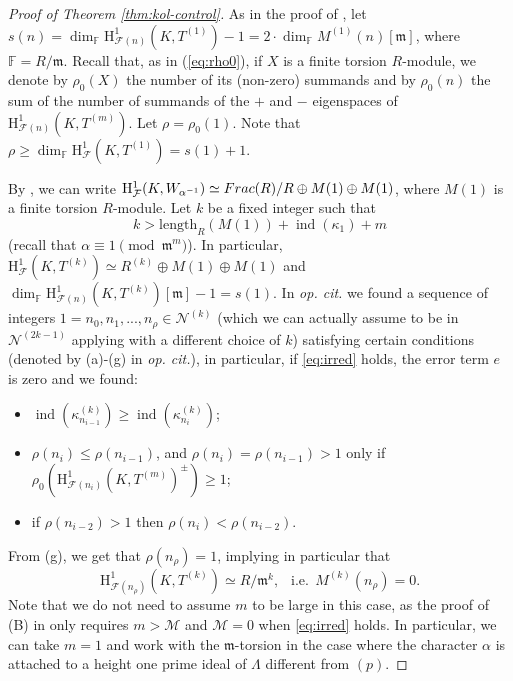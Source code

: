 \documentclass[10pt,reqno]{amsart}
\numberwithin{equation}{section}
\theoremstyle{plain}
\theoremstyle{definition}
\theoremstyle{definition}
\theoremstyle{plain}
\theoremstyle{plain}
\theoremstyle{plain}
\theoremstyle{plain}
\theoremstyle{plain}
\theoremstyle{plain}
\DeclareMathOperator{\ord}{ord}
\newcommand{\ind}{\operatorname{ind}}
\newcommand{\F}{\mathcal{F}}
\newcommand{\CF}{\mathcal{F}}
\newcommand{\Fcal}{\mathcal{F}}
\newcommand{\cN}{\mathcal{N}}
\newcommand{\kap}{\kappa}
\newcommand{\fm}{\mathfrak{m}}
\newcommand{\rH}{\mathrm{H}}
\begin{document}
\begin{proof}[Proof of Theorem \ref{thm:kol-control}]
As in the proof of \cite[Thm. 6.1.1]{eisenstein_cyc}, let $s(n)= \dim_{\mathbb{F}}\rH^1_{\F(n)}(K,T^{(1)})-1 = 2\cdot\dim_\mathbb{F}M^{(1)}(n)[\fm]$, where $\mathbb{F}=R/\fm$. Recall that, as in (\ref{eq:rho0}),
if $X$ is a finite torsion $R$-module, we denote by $\rho_0(X)$ the number of its (non-zero) summands and by $\rho_0(n)$ the sum of the number of summands of the $+$ and $-$ eigenspaces of $\rH^1_{\F(n)}(K, T^{(m)})$.
Let $\rho = \rho_0(1)$. Note that $\rho \geq \dim_{\mathbb{F}}\rH^1_{\F}(K,T^{(1)}) = s(1)+1$. 

By \cite[Thm 3.3.8]{eisenstein}, we can write $\rH^1_{\Fcal}(K,W_{\alpha^{-1}})\simeq {\rm Frac}(R)/R \oplus M(1)\oplus M(1)$, where $M(1)$ is a finite torsion $R$-module.
Let $k$ be a fixed integer such that 
\begin{equation}\label{eq:kbig}
k > \mathrm{length}_{R}(M(1)) + \ind(\kap_1)+m
\end{equation}
(recall that $\alpha\equiv 1 \pmod{\fm^m}$).
In particular, $\rH^1_{\Fcal}(K,T^{(k)})\simeq R^{(k)} \oplus  M(1)\oplus M(1)$ and  $\dim_{\mathbb{F}}\rH^1_{\F(n)}(K,T^{(k)})[\fm]-1= s(1)$.
In \emph{op. cit.} we found a sequence of integers $1=n_0, n_1,..., n_\rho \in \cN^{(k)}$ (which we can actually assume to be in $\cN^{(2k-1)}$ applying \cite[Prop. 6.3.1]{eisenstein_cyc} with a different choice of $k$) satisfying certain conditions (denoted by (a)-(g) in \emph{op. cit.}), in particular, if \eqref{eq:irred} holds, the error term $e$ is zero and we found:
\begin{itemize}
\item[(e)] $\ind(\kappa_{n_{i-1}}^{(k)})\geq \ind(\kappa_{n_i}^{(k)})$;
\item[(f)]  $\rho(n_i) \leq \rho(n_{i-1})$, and
$\rho(n_i) = \rho(n_{i-1})>1$ only if $\rho_0(\rH^1_{\F(n_{i})}(K,T^{(m)})^\pm)\geq 1$;
\item[(g)] if $\rho(n_{i-2})>1$ then 
$\rho(n_{i}) < \rho(n_{i-2})$.
\end{itemize}
From (g), we get that
$\rho(n_\rho) = 1$, implying in particular that 
\[
\rH^1_{\CF(n_\rho)}(K,T^{(k)}) \simeq R/\fm^k, \ \  \text{ i.e.} \ \  M^{(k)}(n_\rho)= 0.
\]
Note that we do not need to assume $m$ to be large in this case, as the proof of (B) in \cite{eisenstein_cyc} only requires $m>\mathcal{M}$ and $\mathcal{M}=0$ when \eqref{eq:irred} holds. In particular, we can take $m=1$ and work with the $\fm$-torsion in the case where the character $\alpha$ is attached to a height one prime ideal of $\Lambda$ different from $(p)$.


\end{proof}
\end{document}
